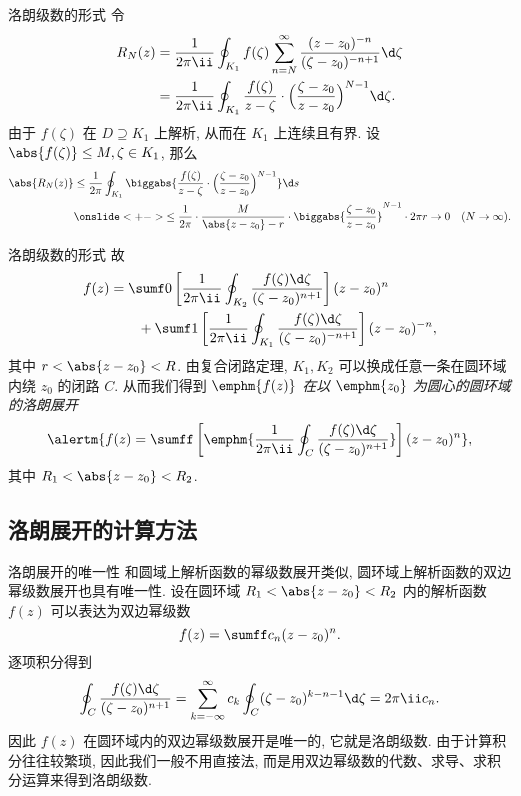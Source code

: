 \begin{frame}{洛朗级数的形式\noexer}
	\onslide<+->
	令
	\begin{align*}
		R_N(z)&=\frac1{2\pi\ii}\oint_{K_1}f(\zeta)\sum_{n=N}^\infty\frac{(z-z_0)^{-n}}{(\zeta-z_0)^{-n+1}}\d\zeta\\
		&=\frac1{2\pi\ii}\oint_{K_1}\frac{f(\zeta)}{z-\zeta}\cdot\Bigl(\frac{\zeta-z_0}{z-z_0}\Bigr)^{N-1}\d\zeta.
	\end{align*}
	\onslide<+->
	由于 $f(\zeta)$ 在 $D\supseteq K_1$ 上解析, 从而在 $K_1$ 上连续且有界.
	\onslide<+->
	设 $\abs{f(\zeta)}\le M,\zeta\in K_1$,
	\onslide<+->
	那么
	\begin{align*}
		\abs{R_N(z)}&\le\frac 1{2\pi}\oint_{K_1}\biggabs{\frac{f(\zeta)}{z-\zeta}\cdot\Bigl(\frac{\zeta-z_0}{z-z_0}\Bigr)^{N-1}}\d s\\
		&\onslide<+->{\le\frac 1{2\pi}\cdot\frac M{\abs{z-z_0}-r}\cdot\biggabs{\frac{\zeta-z_0}{z-z_0}}^{N-1}\cdot 2\pi r\to 0\quad (N\to\infty).}
	\end{align*}
\end{frame}


\begin{frame}{洛朗级数的形式}
	\onslide<+->
	故
	\begin{align*}
		f(z)&=\sumf0\left[\frac1{2\pi\ii}\oint_{K_2}\frac{f(\zeta)\d\zeta}{(\zeta-z_0)^{n+1}}\right](z-z_0)^n\\
		&\qquad+\sumf1 \left[\frac1{2\pi\ii}\oint_{K_1}\frac{f(\zeta)\d\zeta}{(\zeta-z_0)^{-n+1}}\right](z-z_0)^{-n},
	\end{align*}
	其中 $r<\abs{z-z_0}<R$.
	\onslide<+->
	由复合闭路定理, $K_1,K_2$ 可以换成任意一条在圆环域内绕 $z_0$ 的闭路 $C$.
	\onslide<+->
	从而我们得到 \emph{$\emphm{f(z)}$ 在以 $\emphm{z_0}$ 为圆心的圆环域的洛朗展开}
	\[
		\alertm{f(z)=\sumff\left[\emphm{\frac1{2\pi\ii}\oint_C\frac{f(\zeta)\d\zeta}{(\zeta-z_0)^{n+1}}}\right](z-z_0)^n},
	\]
	其中 $R_1<\abs{z-z_0}<R_2$.
\end{frame}


\subsection{洛朗展开的计算方法}

\begin{frame}{洛朗展开的唯一性}
	\onslide<+->
	和圆域上解析函数的幂级数展开类似, 圆环域上解析函数的双边幂级数展开也具有唯一性.
	\onslide<+->
	设在圆环域 $R_1<\abs{z-z_0}<R_2$ 内的解析函数 $f(z)$ 可以表达为双边幂级数
	\[
		f(z)=\sumff c_n(z-z_0)^n.
	\]
	\onslide<+->
	逐项积分得到
	\[
		\oint_C\frac{f(\zeta)\d\zeta}{(\zeta-z_0)^{n+1}}
		=\sum_{k=-\infty}^\infty c_k\oint_C(\zeta-z_0)^{k-n-1}\d\zeta
		=2\pi\ii c_n.
	\]
	\onslide<+->
	因此 $f(z)$ 在圆环域内的\alert{双边幂级数展开是唯一的, 它就是洛朗级数}.
	\onslide<+->
	由于计算积分往往较繁琐, 因此我们一般不用直接法, 而是\alert{用双边幂级数的代数、求导、求积分运算}来得到洛朗级数.
\end{frame}


